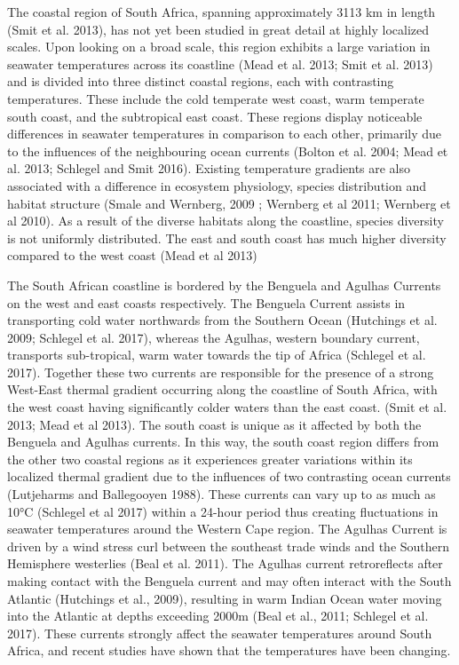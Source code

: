 \documentclass[12pt,]{article}
\begin{document}
The coastal region of South Africa, spanning approximately 3113 km in
length (Smit et al. 2013), has not yet been studied in great detail at
highly localized scales. Upon looking on a broad scale, this region
exhibits a large variation in seawater temperatures across its coastline
(Mead et al. 2013; Smit et al. 2013) and is divided into three distinct
coastal regions, each with contrasting temperatures. These include the
cold temperate west coast, warm temperate south coast, and the
subtropical east coast. These regions display noticeable differences in
seawater temperatures in comparison to each other, primarily due to the
influences of the neighbouring ocean currents (Bolton et al. 2004; Mead
et al. 2013; Schlegel and Smit 2016). Existing temperature gradients are
also associated with a difference in ecosystem physiology, species
distribution and habitat structure (Smale and Wernberg, 2009 ; Wernberg
et al 2011; Wernberg et al 2010). As a result of the diverse habitats
along the coastline, species diversity is not uniformly distributed. The
east and south coast has much higher diversity compared to the west
coast (Mead et al 2013)

The South African coastline is bordered by the Benguela and Agulhas
Currents on the west and east coasts respectively. The Benguela Current
assists in transporting cold water northwards from the Southern Ocean
(Hutchings et al. 2009; Schlegel et al. 2017), whereas the Agulhas,
western boundary current, transports sub-tropical, warm water towards
the tip of Africa (Schlegel et al. 2017). Together these two currents
are responsible for the presence of a strong West-East thermal gradient
occurring along the coastline of South Africa, with the west coast
having significantly colder waters than the east coast. (Smit et al.
2013; Mead et al 2013). The south coast is unique as it affected by both
the Benguela and Agulhas currents. In this way, the south coast region
differs from the other two coastal regions as it experiences greater
variations within its localized thermal gradient due to the influences
of two contrasting ocean currents (Lutjeharms and Ballegooyen 1988).
These currents can vary up to as much as 10°C (Schlegel et al 2017)
within a 24-hour period thus creating fluctuations in seawater
temperatures around the Western Cape region. The Agulhas Current is
driven by a wind stress curl between the southeast trade winds and the
Southern Hemisphere westerlies (Beal et al. 2011). The Agulhas current
retroreflects after making contact with the Benguela current and may
often interact with the South Atlantic (Hutchings et al., 2009),
resulting in warm Indian Ocean water moving into the Atlantic at depths
exceeding 2000m (Beal et al., 2011; Schlegel et al. 2017). These
currents strongly affect the seawater temperatures around South Africa,
and recent studies have shown that the temperatures have been changing.
\end{document}

